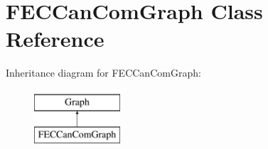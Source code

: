 \hypertarget{classFECCanComGraph}{
\section{FECCanComGraph Class Reference}
\label{classFECCanComGraph}
}
Inheritance diagram for FECCanComGraph:\begin{figure}[H]
\begin{center}
\leavevmode
\includegraphics[height=2.000000cm]{classFECCanComGraph}
\end{center}
\end{figure}
